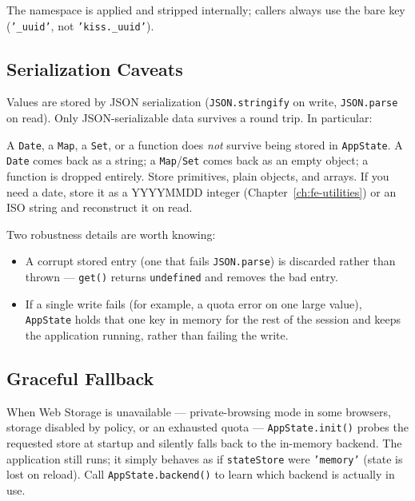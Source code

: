 The namespace is applied and stripped internally; callers always use the bare key (\texttt{'\_uuid'}, not \texttt{'kiss.\_uuid'}).

\subsection{Serialization Caveats}
\label{sec:rs-appstate-serialize}

Values are stored by JSON serialization (\texttt{JSON.stringify} on write, \texttt{JSON.parse} on read).  Only JSON-serializable data survives a round trip.  In particular:

\begin{warnbox}
A \texttt{Date}, a \texttt{Map}, a \texttt{Set}, or a function does \emph{not} survive being stored in \texttt{AppState}.  A \texttt{Date} comes back as a string; a \texttt{Map}/\texttt{Set} comes back as an empty object; a function is dropped entirely.  Store primitives, plain objects, and arrays.  If you need a date, store it as a YYYYMMDD integer (Chapter~\ref{ch:fe-utilities}) or an ISO string and reconstruct it on read.
\end{warnbox}

\noindent
Two robustness details are worth knowing:

\begin{itemize}
  \item A corrupt stored entry (one that fails \texttt{JSON.parse}) is discarded rather than thrown --- \texttt{get()} returns \texttt{undefined} and removes the bad entry.
  \item If a single write fails (for example, a quota error on one large value), \texttt{AppState} holds that one key in memory for the rest of the session and keeps the application running, rather than failing the write.
\end{itemize}

\subsection{Graceful Fallback}
\label{sec:rs-appstate-fallback}

When Web Storage is unavailable --- private-browsing mode in some browsers, storage disabled by policy, or an exhausted quota --- \texttt{AppState.init()} probes the requested store at startup and silently falls back to the in-memory backend.  The application still runs; it simply behaves as if \texttt{stateStore} were \texttt{'memory'} (state is lost on reload).  Call \texttt{AppState.backend()} to learn which backend is actually in use.

